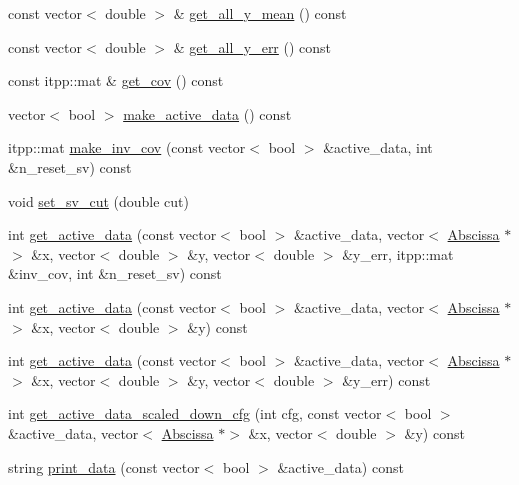\begin{DoxyCompactItemize}
\item 
const vector$<$ double $>$ \& \mbox{\hyperlink{classData_a5b3bba18a4893fc7cb415beaed1ef859}{get\+\_\+all\+\_\+y\+\_\+mean}} () const
\item 
const vector$<$ double $>$ \& \mbox{\hyperlink{classData_ad4988122408ff487d5f891a9b04b3c83}{get\+\_\+all\+\_\+y\+\_\+err}} () const
\item 
const itpp\+::mat \& \mbox{\hyperlink{classData_a19b920edbea6526f6db747bfe1c4c1c2}{get\+\_\+cov}} () const
\item 
vector$<$ bool $>$ \mbox{\hyperlink{classData_af5d089365e8be78e4cd486bda87f37b4}{make\+\_\+active\+\_\+data}} () const
\item 
itpp\+::mat \mbox{\hyperlink{classData_a39cfb18f88b5b75d640404d87b428820}{make\+\_\+inv\+\_\+cov}} (const vector$<$ bool $>$ \&active\+\_\+data, int \&n\+\_\+reset\+\_\+sv) const
\item 
void \mbox{\hyperlink{classData_a8faffbd514fe8831470ce0e982c048da}{set\+\_\+sv\+\_\+cut}} (double cut)
\item 
int \mbox{\hyperlink{classData_acde259686a74799b2fea4d1383d43ec4}{get\+\_\+active\+\_\+data}} (const vector$<$ bool $>$ \&active\+\_\+data, vector$<$ \mbox{\hyperlink{classAbscissa}{Abscissa}} $\ast$$>$ \&x, vector$<$ double $>$ \&y, vector$<$ double $>$ \&y\+\_\+err, itpp\+::mat \&inv\+\_\+cov, int \&n\+\_\+reset\+\_\+sv) const
\item 
int \mbox{\hyperlink{classData_a0400209f4bebe1ba6128a11612677c24}{get\+\_\+active\+\_\+data}} (const vector$<$ bool $>$ \&active\+\_\+data, vector$<$ \mbox{\hyperlink{classAbscissa}{Abscissa}} $\ast$$>$ \&x, vector$<$ double $>$ \&y) const
\item 
int \mbox{\hyperlink{classData_aa57667ce832cbf712b9a77a70ccfdbac}{get\+\_\+active\+\_\+data}} (const vector$<$ bool $>$ \&active\+\_\+data, vector$<$ \mbox{\hyperlink{classAbscissa}{Abscissa}} $\ast$$>$ \&x, vector$<$ double $>$ \&y, vector$<$ double $>$ \&y\+\_\+err) const
\item 
int \mbox{\hyperlink{classData_a2852ff59adff1f77d3e0ce4c620fe501}{get\+\_\+active\+\_\+data\+\_\+scaled\+\_\+down\+\_\+cfg}} (int cfg, const vector$<$ bool $>$ \&active\+\_\+data, vector$<$ \mbox{\hyperlink{classAbscissa}{Abscissa}} $\ast$$>$ \&x, vector$<$ double $>$ \&y) const
\item 
string \mbox{\hyperlink{classData_a8663c7e41a90bdc730ff8b6cbe046c52}{print\+\_\+data}} (const vector$<$ bool $>$ \&active\+\_\+data) const
\item 

\end{DoxyCompactItemize}
